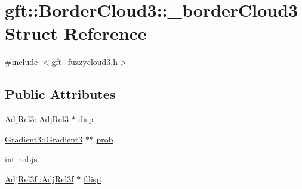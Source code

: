 \hypertarget{structgft_1_1BorderCloud3_1_1__borderCloud3}{\section{gft\-:\-:Border\-Cloud3\-:\-:\-\_\-border\-Cloud3 Struct Reference}
\label{structgft_1_1BorderCloud3_1_1__borderCloud3}
}


{\ttfamily \#include $<$gft\-\_\-fuzzycloud3.\-h$>$}

\subsection*{Public Attributes}
\begin{DoxyCompactItemize}
\item 
\hyperlink{namespacegft_1_1AdjRel3_a0d54e2f148bf5636f3a3faf70d4eb5ae}{Adj\-Rel3\-::\-Adj\-Rel3} $\ast$ \hyperlink{structgft_1_1BorderCloud3_1_1__borderCloud3_a0fec3cf9d771fd02fcbb1687a51cc937}{disp}
\item 
\hyperlink{namespacegft_1_1Gradient3_acc3ba84d5f1e1fd680f64f29da6ac0eb}{Gradient3\-::\-Gradient3} $\ast$$\ast$ \hyperlink{structgft_1_1BorderCloud3_1_1__borderCloud3_a3828cfea35d3619a113a52594662993d}{prob}
\item 
int \hyperlink{structgft_1_1BorderCloud3_1_1__borderCloud3_a9837901f9e28f40dd2918d9687e53582}{nobjs}
\item 
\hyperlink{namespacegft_1_1AdjRel3f_a83ef20d6a560143af34ad546deafbe5f}{Adj\-Rel3f\-::\-Adj\-Rel3f} $\ast$ \hyperlink{structgft_1_1BorderCloud3_1_1__borderCloud3_aa24ef7cdb7021c700f0148d2d137a753}{fdisp}
\end{DoxyCompactItemize}


